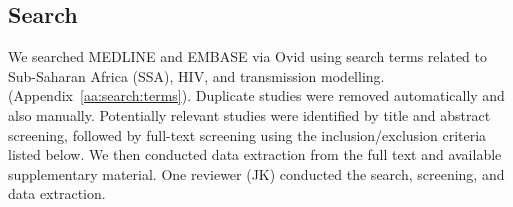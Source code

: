 \subsection{Search}
\label{ss:meth:search}
We searched MEDLINE and EMBASE via Ovid
using search terms related to Sub-Saharan Africa (SSA), HIV, and transmission modelling.
(Appendix~\ref{aa:search:terms}).
Duplicate studies were removed automatically %
and also manually. %
Potentially relevant studies were identified by title and abstract screening, followed 
by full-text screening using the inclusion/exclusion criteria listed below. 
We then conducted data extraction from the full text and available supplementary material.
One reviewer (JK) conducted the search, screening, and data extraction.  
